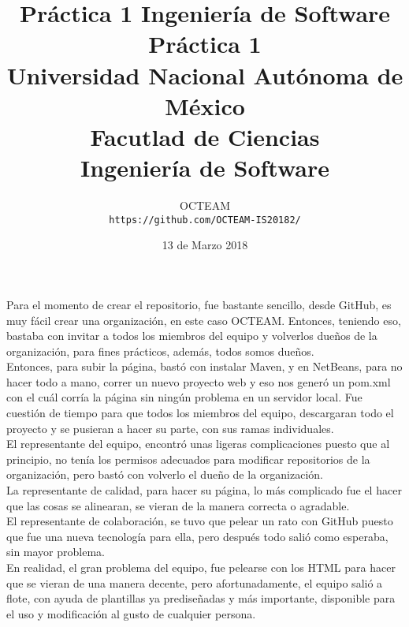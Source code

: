 \documentclass[11pt,letterpaper]{article}
\title{Práctica 1 Ingeniería de Software}
\begin{document}
\title{\vspace{-1.5cm}
	Práctica 1\\
    \large Universidad Nacional Autónoma de México\\
    Facutlad de Ciencias\\
    Ingeniería de Software\\
}
\author{
	OCTEAM\\
    \texttt{https://github.com/OCTEAM-IS20182/}
    }
\date{13 de Marzo 2018}
\maketitle

Para el momento de crear el repositorio, fue bastante sencillo, desde GitHub, es muy fácil crear una organización, en este caso OCTEAM. Entonces, teniendo eso, bastaba con invitar a todos los miembros del equipo y volverlos dueños de la organización, para fines prácticos, además, todos somos dueños.\\

Entonces, para subir la página, bastó con instalar Maven, y en NetBeans, para no hacer todo a mano, correr un nuevo proyecto web y eso nos generó un pom.xml con el cuál corría la página sin ningún problema en un servidor local. Fue cuestión de tiempo para que todos los miembros del equipo, descargaran todo el proyecto y se pusieran a hacer su parte, con sus ramas individuales.\\

El representante del equipo, encontró unas ligeras complicaciones puesto que al principio, no tenía los permisos adecuados para modificar repositorios de la organización, pero bastó con volverlo el dueño de la organización.\\

La representante de calidad, para hacer su página, lo más complicado fue el hacer que las cosas se alinearan, se vieran de la manera correcta o agradable.\\

El representante de colaboración, se tuvo que pelear un rato con GitHub puesto que fue una nueva tecnología para ella, pero después todo salió como esperaba, sin mayor problema.\\

En realidad, el gran problema del equipo, fue pelearse con los HTML para hacer que se vieran de una manera decente, pero afortunadamente, el equipo salió a flote, con ayuda de plantillas ya prediseñadas y más importante, disponible para el uso y modificación al gusto de cualquier persona.\\
\end{document}
